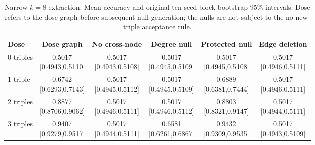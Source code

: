 \begin{table}[H]\centering
\caption{Narrow $k=8$ extraction. Mean accuracy and original ten-seed-block bootstrap 95\% intervals. Dose refers to the dose graph before subsequent null generation; the nulls are not subject to the no-new-triple acceptance rule.}\label{tab:full-S2_narrow}
\small\setlength{\tabcolsep}{4pt}
\begin{tabular}{lccccc}\toprule
Dose & Dose graph & No cross-node & Degree null & Protected null & Edge deletion \\ \midrule
0 triples & \shortstack{0.5017\\{}[0.4943,0.5110]} & \shortstack{0.5017\\{}[0.4943,0.5108]} & \shortstack{0.5017\\{}[0.4945,0.5109]} & \shortstack{0.5017\\{}[0.4945,0.5108]} & \shortstack{0.5017\\{}[0.4946,0.5111]} \\[3pt]
1 triple & \shortstack{0.6742\\{}[0.6293,0.7143]} & \shortstack{0.5017\\{}[0.4945,0.5112]} & \shortstack{0.5017\\{}[0.4945,0.5109]} & \shortstack{0.6889\\{}[0.6381,0.7444]} & \shortstack{0.5017\\{}[0.4946,0.5111]} \\[3pt]
2 triples & \shortstack{0.8877\\{}[0.8706,0.9062]} & \shortstack{0.5017\\{}[0.4946,0.5111]} & \shortstack{0.5017\\{}[0.4946,0.5112]} & \shortstack{0.8803\\{}[0.8321,0.9147]} & \shortstack{0.5017\\{}[0.4944,0.5111]} \\[3pt]
3 triples & \shortstack{0.9407\\{}[0.9279,0.9517]} & \shortstack{0.5017\\{}[0.4944,0.5111]} & \shortstack{0.6581\\{}[0.6261,0.6867]} & \shortstack{0.9432\\{}[0.9309,0.9535]} & \shortstack{0.5017\\{}[0.4943,0.5109]} \\[3pt]
\bottomrule\end{tabular}
\end{table}
